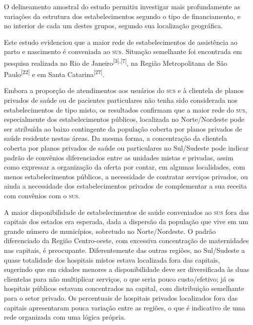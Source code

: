\documentclass{article}
\begin{document}
O delineamento amostral do estudo permitiu investigar mais profundamente as
variações
da estrutura dos estabelecimentos segundo o tipo de financiamento, e no interior
de
cada um destes grupos, segundo sua localização geográfica.

Este estudo evidenciou que a maior rede de estabelecimentos de assistência ao
parto e
nascimento é conveniada ao \textsc{sus}. Situação semelhante foi encontrada em pesquisa
realizada no Rio de Janeiro\textsuperscript{[}\textsuperscript{3}\textsuperscript{]}\textsuperscript{,}\textsuperscript{[}\textsuperscript{7}\textsuperscript{]}, na Região Metropolitana de São Paulo\textsuperscript{[}\textsuperscript{22}\textsuperscript{]}
e em Santa Catarina\textsuperscript{[}\textsuperscript{27}\textsuperscript{]}.

Embora a proporção de atendimentos aos usuários do \textsc{sus} e à clientela de planos
privados de saúde ou de pacientes particulares não tenha sido considerada nos
estabelecimentos de tipo misto, os resultados confirmam que a maior rede do \textsc{sus},
especialmente dos estabelecimentos públicos, localizada no Norte/Nordeste pode
ser
atribuída ao baixo contingente da população coberta por planos privados de saúde
residente nestas áreas. Da mesma forma, a concentração da clientela coberta por
planos privados de saúde ou particulares no Sul/Sudeste pode indicar padrão de
convênios diferenciados entre as unidades mistas e privadas, assim como
expressar a
organização da oferta por contar, em algumas localidades, com menos
estabelecimentos
públicos, a necessidade de contratar serviços privados, ou ainda a necessidade
dos
estabelecimentos privados de complementar a sua receita com convênios com o \textsc{sus}.

A maior disponibilidade de estabelecimentos de saúde conveniados ao \textsc{sus} fora das
capitais dos estados era esperada, dada a dispersão da população que vive em um
grande número de municípios, sobretudo no Norte/Nordeste. O padrão diferenciado
da
Região Centro-oeste, com excessiva concentração de maternidades nas capitais, é
preocupante. Diferentemente das outras regiões, no Sul/Sudeste a quase
totalidade
dos hospitais mistos estava localizada fora das capitais, sugerindo que em
cidades
menores a disponibilidade deve ser diversificada às duas clientelas para não
multiplicar serviços, o que seria pouco custo/efetivo; já os hospitais públicos
estavam concentrados na capital, com distribuição semelhante para o setor
privado.
Os percentuais de hospitais privados localizados fora das capitais apresentaram
pouca variação entre as regiões, o que é indicativo de uma rede organizada com
uma
lógica própria.
\end{document}
